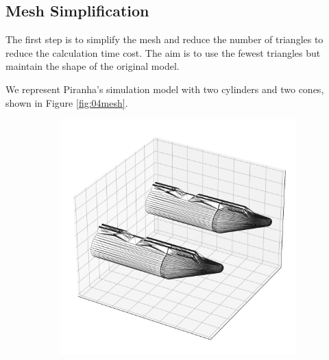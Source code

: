 \subsection{Mesh Simplification}

The first step is to simplify the mesh and reduce the number of triangles to reduce the calculation time cost. The aim is to use the fewest triangles but maintain the shape of the original model.

We represent Piranha's simulation model with two cylinders and two cones, shown in Figure \ref{fig:04mesh}. 

\begin{figure}[H]
     \centering
     \hspace{1cm}
     \begin{subfigure}[b]{0.4\textwidth}
         \centering
         \includegraphics[width=\textwidth]{images/04orca_pontoon.pdf}
     \end{subfigure}
     \hfill
     \begin{subfigure}[b]{0.4\textwidth}
         \centering

\end{subfigure}
\end{figure}
